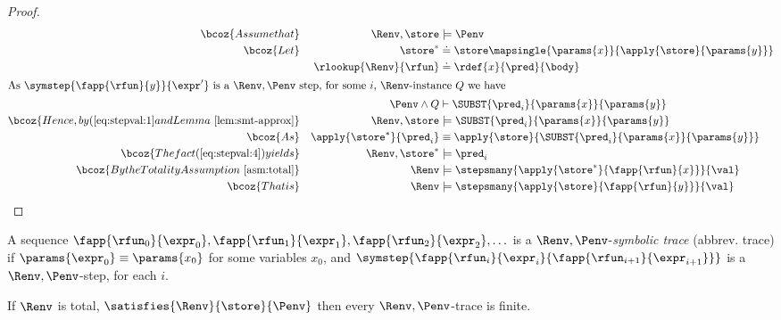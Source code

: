 \begin{proof}
\begin{alignat}{3}
\bcoz{Assume that}
  && \Renv, \store & \models \Penv \label{eq:stepval:1} \\
\bcoz{Let}
  && \store^*               & \doteq \store \mapsingle{\params{x}}{\apply{\store}{\params{y}}} \label{eq:stepval:2}\\
  && \rlookup{\Renv}{\rfun} & \doteq \rdef{x}{\pred}{\body} \label{eq:stepval:3} \\
\intertext{As $\symstep{\fapp{\rfun}{y}}{\expr'}$ is a $\Renv,\Penv$ step,
for some $i$, \Renv-instance $Q$ we have}
  && \Penv \wedge Q & \vdash \SUBST{\pred_i}{\params{x}}{\params{y}} \notag \\
\bcoz{Hence, by (\ref{eq:stepval:1} and Lemma~\ref{lem:smt-approx}}
  && \Renv, \store  & \models \SUBST{\pred_i}{\params{x}}{\params{y}} \label{eq:stepval:4}\\
\bcoz{As}
  && \apply{\store^*}{\pred_i}
  & \equiv \apply{\store}{\SUBST{\pred_i}{\params{x}}{\params{y}}} \\
\bcoz{The fact (\ref{eq:stepval:4}) yields}
  && \Renv, \store^*  & \models \pred_i \notag \\
\bcoz{By the Totality Assumption~\ref{asm:total}}
  && \Renv & \models \stepsmany{\apply{\store^*}{\fapp{\rfun}{x}}}{\val} \notag \\
\bcoz{That is}
  && \Renv & \models \stepsmany{\apply{\store}{\fapp{\rfun}{y}}}{\val} \notag
\end{alignat}
\end{proof}

%
A sequence
%
$\fapp{\rfun_0}{\expr_0},\fapp{\rfun_1}{\expr_1},\fapp{\rfun_2}{\expr_2},\ldots$
%
is a $\Renv,\Penv$-\emph{symbolic trace} (abbrev. trace)
if $\params{\expr_0} \equiv \params{x_0}$ for some variables $x_0$,
and $\symstep{\fapp{\rfun_i}{\expr_i}{\fapp{\rfun_{i+1}}{\expr_{i+1}}}}$
is a $\Renv,\Penv$-step, for each $i$.

\begin{theorem}\label{thm:finite-trace}
If $\Renv$ is total, $\satisfies{\Renv}{\store}{\Penv}$
then every $\Renv,\Penv$-trace is finite.
\end{theorem}

